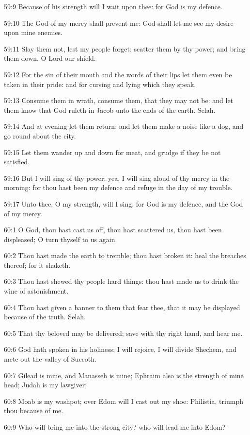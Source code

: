 59:9 Because of his strength will I wait upon thee: for God is my
defence.

59:10 The God of my mercy shall prevent me: God shall let me see my
desire upon mine enemies.

59:11 Slay them not, lest my people forget: scatter them by thy power;
and bring them down, O Lord our shield.

59:12 For the sin of their mouth and the words of their lips let them
even be taken in their pride: and for cursing and lying which they
speak.

59:13 Consume them in wrath, consume them, that they may not be: and
let them know that God ruleth in Jacob unto the ends of the earth.
Selah.

59:14 And at evening let them return; and let them make a noise like a
dog, and go round about the city.

59:15 Let them wander up and down for meat, and grudge if they be not
satisfied.

59:16 But I will sing of thy power; yea, I will sing aloud of thy
mercy in the morning: for thou hast been my defence and refuge in the
day of my trouble.

59:17 Unto thee, O my strength, will I sing: for God is my defence,
and the God of my mercy.



60:1 O God, thou hast cast us off, thou hast scattered us, thou hast
been displeased; O turn thyself to us again.

60:2 Thou hast made the earth to tremble; thou hast broken it: heal
the breaches thereof; for it shaketh.

60:3 Thou hast shewed thy people hard things: thou hast made us to
drink the wine of astonishment.

60:4 Thou hast given a banner to them that fear thee, that it may be
displayed because of the truth. Selah.

60:5 That thy beloved may be delivered; save with thy right hand, and
hear me.

60:6 God hath spoken in his holiness; I will rejoice, I will divide
Shechem, and mete out the valley of Succoth.

60:7 Gilead is mine, and Manasseh is mine; Ephraim also is the
strength of mine head; Judah is my lawgiver;

60:8 Moab is my washpot; over Edom will I cast out my shoe: Philistia,
triumph thou because of me.

60:9 Who will bring me into the strong city? who will lead me into
Edom?


